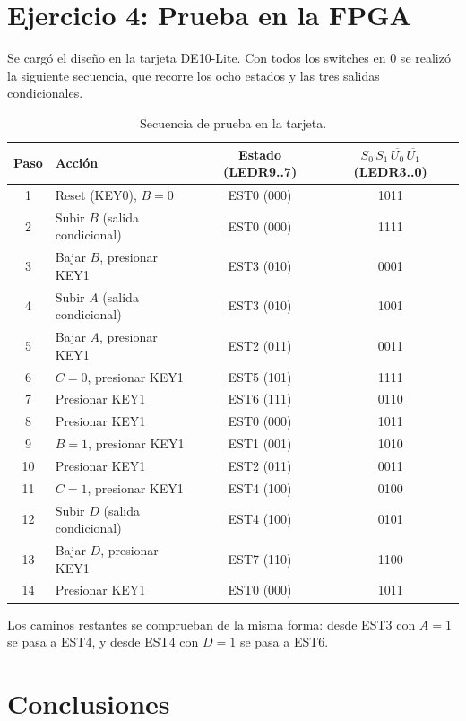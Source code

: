 \documentclass[11pt,letterpaper]{article}
\newcommand{\nb}[1]{\overline{#1}}
\begin{document}
\section{Ejercicio 4: Prueba en la FPGA}

Se cargó el diseño en la tarjeta DE10-Lite. Con todos los switches en 0 se realizó la siguiente secuencia, que recorre los ocho estados y las tres salidas condicionales.

\begin{table}[H]
\centering
\begin{tabular}{clcc}
\toprule
\textbf{Paso} & \textbf{Acción} & \textbf{Estado (LEDR9..7)} & \textbf{$S_0\,S_1\,\nb{U_0}\,\nb{U_1}$ (LEDR3..0)} \\
\midrule
1  & Reset (KEY0), $B=0$            & EST0 (000) & 1011 \\
2  & Subir $B$ (salida condicional)  & EST0 (000) & 1111 \\
3  & Bajar $B$, presionar KEY1       & EST3 (010) & 0001 \\
4  & Subir $A$ (salida condicional)  & EST3 (010) & 1001 \\
5  & Bajar $A$, presionar KEY1       & EST2 (011) & 0011 \\
6  & $C=0$, presionar KEY1           & EST5 (101) & 1111 \\
7  & Presionar KEY1                  & EST6 (111) & 0110 \\
8  & Presionar KEY1                  & EST0 (000) & 1011 \\
9  & $B=1$, presionar KEY1           & EST1 (001) & 1010 \\
10 & Presionar KEY1                  & EST2 (011) & 0011 \\
11 & $C=1$, presionar KEY1           & EST4 (100) & 0100 \\
12 & Subir $D$ (salida condicional)  & EST4 (100) & 0101 \\
13 & Bajar $D$, presionar KEY1       & EST7 (110) & 1100 \\
14 & Presionar KEY1                  & EST0 (000) & 1011 \\
\bottomrule
\end{tabular}
\caption{Secuencia de prueba en la tarjeta.}
\end{table}

Los caminos restantes se comprueban de la misma forma: desde EST3 con $A=1$ se pasa a EST4, y desde EST4 con $D=1$ se pasa a EST6.

\section{Conclusiones}

\end{document}
